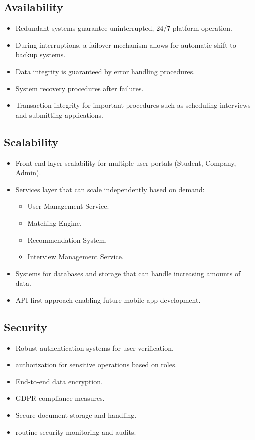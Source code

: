 \subsection{Availability}
\label{subsec:availability}
\begin{itemize}
    \item Redundant systems guarantee uninterrupted, 24/7 platform operation.
    \item During interruptions, a failover mechanism allows for automatic shift to backup systems.
    \item Data integrity is guaranteed by error handling procedures.
    \item System recovery procedures after failures.
    \item Transaction integrity for important procedures such as scheduling interviews and submitting applications.
\end{itemize}

\subsection{Scalability}
\label{subsec:scalability}
\begin{itemize}
    \item Front-end layer scalability for multiple user portals (Student, Company, Admin).
    \item Services layer that can scale independently based on demand:
    \begin{itemize}
        \item User Management Service.
        \item Matching Engine.
        \item Recommendation System.
        \item Interview Management Service.
    \end{itemize}
    \item Systems for databases and storage that can handle increasing amounts of data.
    \item API-first approach enabling future mobile app development.
\end{itemize}

\subsection{Security}
\label{subsec:security}
\begin{itemize}
    \item Robust authentication systems for user verification.
    \item authorization for sensitive operations based on roles.
    \item End-to-end data encryption.
    \item GDPR compliance measures.
    \item Secure document storage and handling.
    \item routine security monitoring and audits.
\end{itemize}

